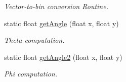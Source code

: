 \begin{DoxyCompactItemize}
\begin{DoxyCompactList}\small\item\em Vector-\/to-\/bin conversion Routine. \item\end{DoxyCompactList}\item 
static float \hyperlink{classITL__histogram_a4281e6d3a1b694340308520139c0be93}{getAngle} (float x, float y)
\begin{DoxyCompactList}\small\item\em Theta computation. \item\end{DoxyCompactList}\item 
static float \hyperlink{classITL__histogram_a9734482a7ba043f0c0214518bd68fed3}{getAngle2} (float x, float y)
\begin{DoxyCompactList}\small\item\em Phi computation. \item\end{DoxyCompactList}\end{DoxyCompactItemize}
